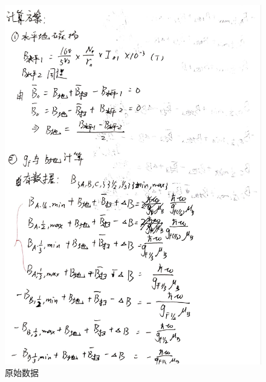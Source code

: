 \documentclass[10pt,hyperref,a4paper,UTF8]{ctexart}
\begin{document}
\begin{figure}[thbp!]
\begin{minipage}[t]{0.49\linewidth}
                \includegraphics[width=\linewidth]{figures/appedix4.jpg}
        \end{minipage}
        \caption{原始数据}
        \label{fig:image_group}
\end{figure}
\end{document}

